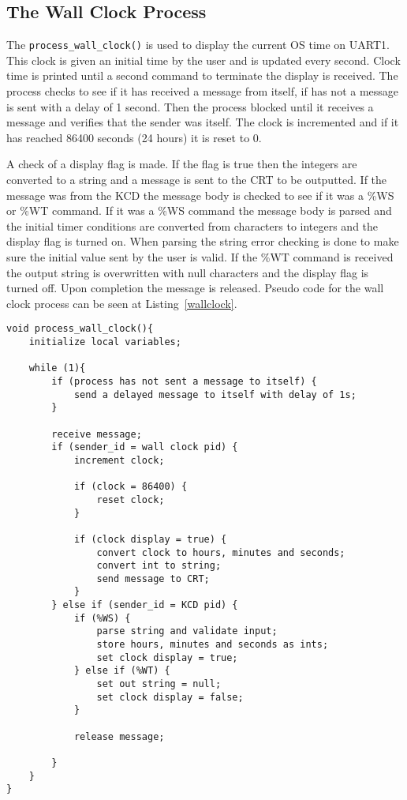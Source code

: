 \documentclass[oneside]{article}
\begin{document}
\subsection*{The Wall Clock Process}

The \texttt{process\_wall\_clock()} is used to display the current OS time on
UART1. This clock is given an initial time by the user and is updated every
second. Clock time is printed until a second command to terminate the display
is received.  The process checks to see if it has received a message from
itself, if has not a message is sent with a delay of 1 second. Then the process
blocked until it receives a message and verifies that the sender was itself.
The clock is incremented and if it has reached 86400 seconds (24 hours) it is
reset to 0. 

A check of a display flag is made. If the flag is true then the integers are
converted to a string and a message is sent to the CRT to be outputted.  If the
message was from the KCD the message body is checked to see if it was a \%WS or
\%WT command. If it was a \%WS command the message body is parsed and the
initial timer conditions are converted from characters to integers and the
display flag is turned on. When parsing the string error checking is done to
make sure the initial value sent by the user is valid. If the \%WT command is
received the output string is overwritten with null characters and the display
flag is turned off. Upon completion the message is released. Pseudo code for
the wall clock process can be seen at Listing~\ref{wallclock}.

\begin{lstlisting}
void process_wall_clock(){
    initialize local variables;

    while (1){
        if (process has not sent a message to itself) {
            send a delayed message to itself with delay of 1s;
        }
        
        receive message;
        if (sender_id = wall clock pid) {
            increment clock;

            if (clock = 86400) {
                reset clock;
            }
            
            if (clock display = true) {
                convert clock to hours, minutes and seconds;
                convert int to string;
                send message to CRT;
            }
        } else if (sender_id = KCD pid) {
            if (%WS) {
                parse string and validate input;
                store hours, minutes and seconds as ints;
                set clock display = true;
            } else if (%WT) {
                set out string = null;
                set clock display = false;
            }
            
            release message;        

        }
    }
}
\end{lstlisting}
\end{document}
